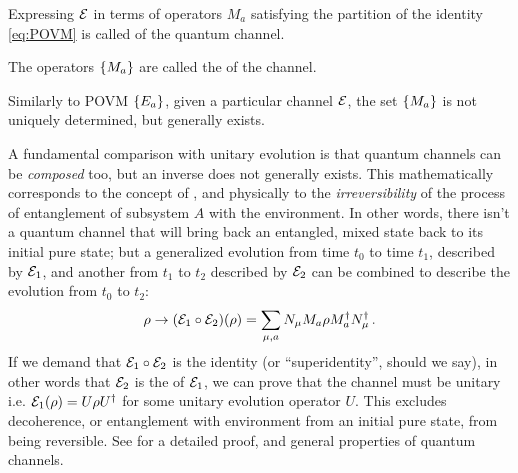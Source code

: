 Expressing $\mathcal{E}$ in terms of operators $M_a$
satisfying the partition of the identity \eqref{eq:POVM}
is called
 of the quantum channel.

The operators $\left\{M_a\right\}$ are called the 
of the channel.

Similarly to POVM $\left\{E_a\right\}$, given a particular channel $\mathcal{E}$,
the set $\left\{M_a\right\}$ is not uniquely determined, but
generally exists.

A fundamental comparison with unitary evolution is that
quantum channels can be \emph{composed} too, but an inverse
does not generally exists.
This mathematically corresponds to the concept of ,
and physically to the \emph{irreversibility} of the process
of entanglement of subsystem $A$ with the environment. In other words,
there isn't a quantum channel that will bring back an entangled,
mixed state back to its initial pure state;
but a generalized evolution from time $t_0$ to time $t_1$,
described by $\mathcal{E}_1$,
and another from $t_1$ to $t_2$ described by $\mathcal{E}_2$
can be combined to describe the evolution from $t_0$ to $t_2$:
\[
  \rho \rightarrow \qty(\mathcal{E}_1 \circ \mathcal{E}_2) (\rho) =
  \sum_{\mu,a} N_{\mu} M_a \rho M_a^{\dagger} N_{\mu}^{\dagger}
  \,\text{.}
\]
If we demand that $\mathcal{E}_1 \circ \mathcal{E}_2$
is the identity (or ``superidentity'', should we say),
in other words that $\mathcal{E}_2$
is the  of $\mathcal{E}_1$,
we can prove that the channel must be unitary i.e.
$\mathcal{E}_1(\rho) = U \rho U^{\dagger}$
for some unitary evolution operator $U$.
This excludes decoherence,
or entanglement with environment from an initial pure state,
from being reversible.
See \cite[sec.3.2]{PreskillNotes} for a detailed proof,
and general properties of quantum channels.
